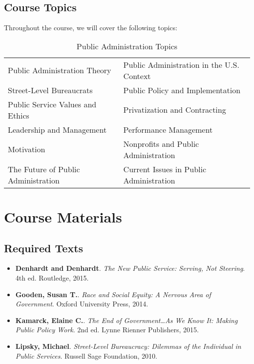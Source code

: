 \documentclass[12pt, letterpaper]{article}
\begin{document}
    \subsection*{Course Topics}
    Throughout the course, we will cover the following topics:
    \begin{table}[h]
        \centering
        \caption{Public Administration Topics}
        \begin{tabular}{ll}\hline
            Public Administration Theory & Public Administration in the U.S. Context \\
            Street-Level Bureaucrats & Public Policy and Implementation \\
            Public Service Values and Ethics & Privatization and Contracting \\
            Leadership and Management & Performance Management \\
            Motivation & Nonprofits and Public Administration \\
            The Future of Public Administration & Current Issues in Public Administration \\ \hline
        \end{tabular}
        \label{tab:pa_topics}
        \end{table}
    
    \section{Course Materials}
    \subsection*{Required Texts}
    \begin{itemize}
        \item \textbf{Denhardt and Denhardt}. \textit{The New Public Service: Serving, Not Steering}. 4th ed. Routledge, 2015.
        \item \textbf{Gooden, Susan T.}. \textit{Race and Social Equity: A Nervous Area of Government}. Oxford University Press, 2014.
        \item \textbf{Kamarck, Elaine C.}. \textit{The End of Government…As We Know It: Making Public Policy Work}. 2nd ed. Lynne Rienner Publishers, 2015.
        \item \textbf{Lipsky, Michael}. \textit{Street-Level Bureaucracy: Dilemmas of the Individual in Public Services}. Russell Sage Foundation, 2010.
    \end{itemize}
    
\end{document}
